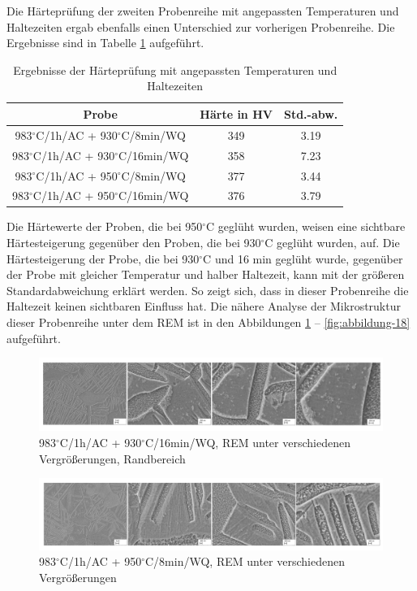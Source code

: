 Die Härteprüfung der zweiten Probenreihe mit angepassten Temperaturen und Haltezeiten ergab ebenfalls einen Unterschied zur vorherigen Probenreihe. Die Ergebnisse sind in Tabelle \ref{Tabelle 7} aufgeführt.

\begin{table}[h]
\centering
\begin{tabular}{|c|c|c|}
\hline 
Probe & Härte in HV &  Std.-abw. \\ 
\hline 
983$^\circ$C/1h/AC + 930$^\circ$C/8min/WQ & 349 & 3.19 \\ 
\hline 
983$^\circ$C/1h/AC + 930$^\circ$C/16min/WQ & 358 & 7.23 \\ 
\hline 
983$^\circ$C/1h/AC + 950$^\circ$C/8min/WQ & 377 & 3.44 \\ 
\hline 
983$^\circ$C/1h/AC + 950$^\circ$C/16min/WQ & 376 & 3.79 \\ 
\hline 
\end{tabular} 
\caption{Ergebnisse der Härteprüfung mit angepassten Temperaturen und Haltezeiten}
\label{Tabelle 7}
\end{table}

Die Härtewerte der Proben, die bei 950$^\circ$C geglüht wurden, weisen eine sichtbare Härtesteigerung gegenüber den Proben, die bei 930$^\circ$C geglüht wurden, auf. Die Härtesteigerung der Probe, die bei 930$^\circ$C und 16 min geglüht wurde, gegenüber der Probe mit gleicher Temperatur und halber Haltezeit, kann mit der größeren Standardabweichung erklärt werden. So zeigt sich, dass in dieser Probenreihe die Haltezeit keinen sichtbaren Einfluss hat. Die nähere Analyse der Mikrostruktur dieser Probenreihe unter dem REM ist in den Abbildungen \ref{fig:abbildung-16} -- \ref{fig:abbildung-18} aufgeführt.

\begin{figure}[h]
	\centering
	\includegraphics[width=0.9\linewidth]{./Bilder/Abbildung 16}
	\caption[Abbildung 16]{983$^\circ$C/1h/AC + 930$^\circ$C/16min/WQ, REM unter verschiedenen Vergrößerungen, Randbereich}
	\label{fig:abbildung-16}
\end{figure}

\begin{figure}[!]
	\centering
	\includegraphics[width=0.9\linewidth]{./Bilder/Abbildung 17}
	\caption[Abbildung 17]{983$^\circ$C/1h/AC + 950$^\circ$C/8min/WQ, REM unter verschiedenen Vergrößerungen}
	\label{fig:abbildung-17}
\end{figure}

